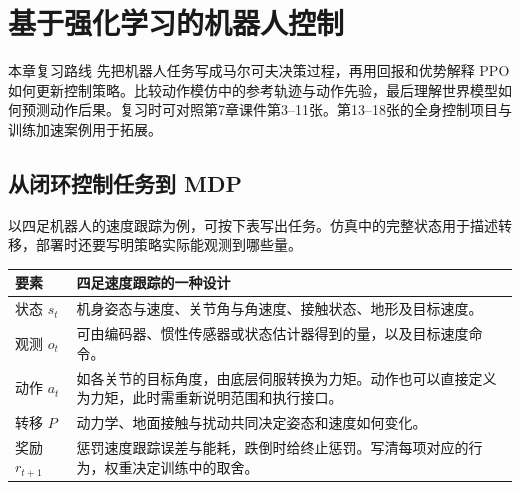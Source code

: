 \chapter{基于强化学习的机器人控制}
\label{chap:reinforcement-learning}

\begin{focusbox}{本章复习路线}
先把机器人任务写成马尔可夫决策过程，再用回报和优势解释 PPO 如何更新控制策略。比较动作模仿中的参考轨迹与动作先验，最后理解世界模型如何预测动作后果。复习时可对照第7章课件第3--11张。第13--18张的全身控制项目与训练加速案例用于拓展。
\end{focusbox}

\section{从闭环控制任务到 MDP}


以四足机器人的速度跟踪为例，可按下表写出任务。仿真中的完整状态用于描述转移，部署时还要写明策略实际能观测到哪些量。

\begin{center}
\small
\begin{tabularx}{\linewidth}{@{}p{2.8cm}X@{}}
\toprule
要素 & 四足速度跟踪的一种设计 \\
\midrule
状态 $s_t$ & 机身姿态与速度、关节角与角速度、接触状态、地形及目标速度。 \\
观测 $o_t$ & 可由编码器、惯性传感器或状态估计器得到的量，以及目标速度命令。 \\
动作 $a_t$ & 如各关节的目标角度，由底层伺服转换为力矩。动作也可以直接定义为力矩，此时需重新说明范围和执行接口。 \\
转移 $P$ & 动力学、地面接触与扰动共同决定姿态和速度如何变化。 \\
奖励 $r_{t+1}$ & 惩罚速度跟踪误差与能耗，跌倒时给终止惩罚。写清每项对应的行为，权重决定训练中的取舍。 \\
\bottomrule
\end{tabularx}
\end{center}

